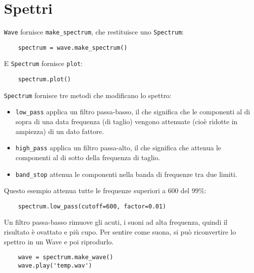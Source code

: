\documentclass[12pt,a4paper]{book}
\begin{document}
\section{Spettri} \label{spectrums} 

{\tt Wave} fornisce \verb"make_spectrum", che restituisce uno {\tt Spectrum}:

\begin{verbatim} 
    spectrum = wave.make_spectrum()
 \end{verbatim} 

E {\tt Spectrum} fornisce  {\tt plot}:

\begin{verbatim} 
    spectrum.plot()
 \end{verbatim} 

{\tt Spectrum} fornisce tre metodi che modificano lo spettro:

\begin{itemize} 

\item \verb"low_pass" applica un filtro passa-basso, il che significa che le componenti al di sopra di una data frequenza (di taglio) vengono attenuate (cioè ridotte in ampiezza) di un dato fattore.

\item \verb"high_pass" applica un filtro passa-alto, il che significa che attenua le componenti al di sotto della frequenza di taglio.

\item \verb"band_stop" attenua le componenti nella banda di frequenze tra due limiti.

\end{itemize} 

Questo esempio attenua tutte le frequenze superiori a 600 del 99\%:

\begin{verbatim} 
    spectrum.low_pass(cutoff=600, factor=0.01)
 \end{verbatim} 

Un filtro passa-basso rimuove gli acuti, i suoni ad alta frequenza, quindi il risultato è ovattato e più cupo. Per sentire come suona, si può riconvertire lo spettro in un Wave e poi riprodurlo.

\begin{verbatim} 
    wave = spectrum.make_wave()
    wave.play('temp.wav')
 \end{verbatim} 
\end{document}
